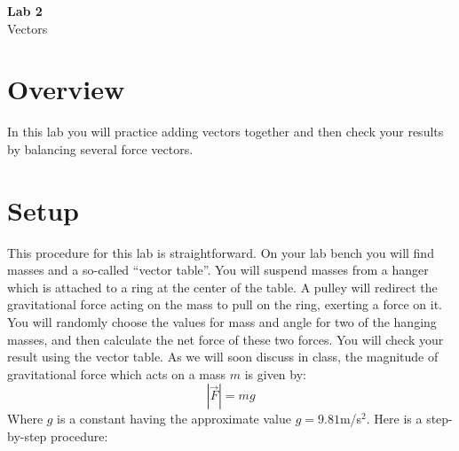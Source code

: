\documentclass{article}
\begin{document}
\fancyfoot[C]{\thepage}
\vspace*{0cm}
\begin{center}
	{\LARGE \textbf{Lab 2}}\\
	\vspace{.25cm}
	{\Large Vectors}
\end{center}

\section*{Overview}
In this lab you will practice adding vectors together and then check your results by balancing several force vectors. 

\section*{Setup}
This procedure for this lab is straightforward. On your lab bench you will find masses and a so-called ``vector table''. You will suspend masses from a hanger which is attached to a ring at the center of the table. A pulley will redirect the gravitational force acting on the mass to pull on the ring, exerting a force on it. You will randomly choose the values for mass and angle for two of the hanging masses, and then calculate the net force of these two forces. You will check your result using the vector table. As we will soon discuss in class, the magnitude of gravitational force which acts on a mass $m$ is given by:
\begin{equation}
|\vec{F}|=mg
\end{equation}
Where $g$ is a constant having the approximate value $g=9.81$m/s$^2$.
Here is a step-by-step procedure:
\end{document}

